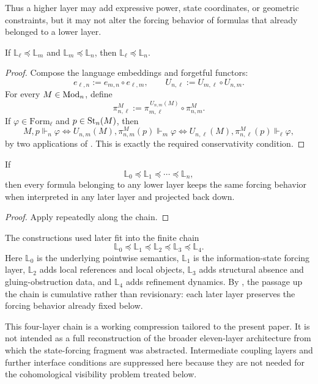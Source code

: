 Thus a higher layer may add expressive power, state coordinates, or geometric constraints, but it may not alter the forcing behavior of formulas that already belonged to a lower layer.

\begin{proposition}\label{prop:conservative-composition}
If $\mathbb{L}_\ell\preceq\mathbb{L}_m$ and $\mathbb{L}_m\preceq\mathbb{L}_n$, then $\mathbb{L}_\ell\preceq\mathbb{L}_n$.
\end{proposition}

\begin{proof}
Compose the language embeddings and forgetful functors:
\[
e_{\ell,n}:=e_{m,n}\circ e_{\ell,m},
\qquad
U_{n,\ell}:=U_{m,\ell}\circ U_{n,m}.
\]
For every $M\in\mathrm{Mod}_n$, define
\[
\pi^M_{n,\ell}:=
\pi^{\,U_{n,m}(M)}_{m,\ell}\circ \pi^M_{n,m}.
\]
If $\varphi\in\mathrm{Form}_\ell$ and $p\in\mathrm{St}_n(M)$, then
\[
M,p\Vdash_n\varphi
\Longleftrightarrow
U_{n,m}(M),\pi^M_{n,m}(p)\Vdash_m\varphi
\Longleftrightarrow
U_{n,\ell}(M),\pi^M_{n,\ell}(p)\Vdash_\ell\varphi,
\]
by two applications of . This is exactly the required conservativity condition.
\end{proof}

\begin{corollary}\label{cor:whole-chain-invariance}
If
\[
\mathbb{L}_0\preceq\mathbb{L}_1\preceq\cdots\preceq\mathbb{L}_n,
\]
then every formula belonging to any lower layer keeps the same forcing behavior when interpreted in any later layer and projected back down.
\end{corollary}

\begin{proof}
Apply  repeatedly along the chain.
\end{proof}

The constructions used later fit into the finite chain
\[
\mathbb{L}_0
\preceq
\mathbb{L}_1
\preceq
\mathbb{L}_2
\preceq
\mathbb{L}_3
\preceq
\mathbb{L}_4.
\]
Here $\mathbb{L}_0$ is the underlying pointwise semantics, $\mathbb{L}_1$ is the information-state forcing layer, $\mathbb{L}_2$ adds local references and local objects, $\mathbb{L}_3$ adds structural absence and gluing-obstruction data, and $\mathbb{L}_4$ adds refinement dynamics. By , the passage up the chain is cumulative rather than revisionary: each later layer preserves the forcing behavior already fixed below.

This four-layer chain is a working compression tailored to the present paper. It is not intended as a full reconstruction of the broader eleven-layer architecture from which the state-forcing fragment was abstracted. Intermediate coupling layers and further interface conditions are suppressed here because they are not needed for the cohomological visibility problem treated below.
